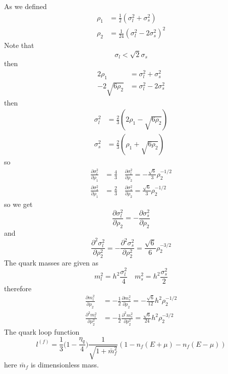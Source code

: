 \documentclass[12pt]{article}
\begin{document}
As we defined
\begin{equation}
\begin{split}
\rho_1&=\frac{1}{2}(\sigma_l^2+\sigma_s^2)\\
\rho_2&=\frac{1}{24}(\sigma_l^2-2 \sigma_s^2)^2
\end{split}
\end{equation}
Note that
\begin{equation}
\sigma_l < \sqrt{2} \sigma_s
\end{equation}
then
\begin{equation}
\begin{split}
2 \rho_1 & = \sigma_l^2 + \sigma_s^2 \\
-2 \sqrt{6 \rho_2} &=\sigma_l^2-2 \sigma_s^2
\end{split}
\end{equation}
then
\begin{equation}
\begin{split}
\sigma_l^2 &= \frac{2}{3}(2\rho_1-\sqrt{6 \rho_2})\\
\sigma_s^2 &= \frac{2}{3} ( \rho_1 + \sqrt{6 \rho_2})
\end{split}
\end{equation}
so
\begin{equation}
\begin{split}
\frac{\partial\sigma_l^2}{\partial \rho_1} &= \frac{4}{3} \quad
\frac{\partial\sigma_l^2}{\partial \rho_2} = -\frac{\sqrt{6}}{3} \rho_2^{-1/2} \\
\frac{\partial\sigma_s^2}{\partial \rho_1} &= \frac{2}{3} \quad
\frac{\partial\sigma_s^2}{\partial \rho_2} = \frac{\sqrt{6}}{3} \rho_2^{-1/2}
\end{split}
\end{equation}
so we get
\begin{equation}
\frac{\partial\sigma_l^2}{\partial \rho_2}=
-\frac{\partial\sigma_s^2}{\partial \rho_2}
\end{equation}
and
\begin{equation}
\frac{\partial^2 \sigma_l^2}{\partial \rho_2^2}=
- \frac{\partial^2 \sigma_s^2}{\partial \rho_2^2}=
\frac{\sqrt{6}}{6}\rho_2^{-3/2}
\end{equation}
The quark masses are given as
\begin{equation}
m_l^2=h^2 \frac{\sigma_l^2}{4} \quad m_s^2 =h^2 \frac {\sigma_s^2}{2}
\end{equation}
therefore
\begin{equation}
\begin{split}
\frac{\partial m_l^2}{\partial \rho_2} &
= -\frac{1}{2} \frac{\partial m_s^2}{\partial \rho_2}
= -\frac{\sqrt{6}}{12}h^2\rho_2^{-1/2}\\
\frac{\partial^2 m_l^2}{\partial \rho_2^2} &
=-\frac{1}{2}\frac{\partial^2 m_s^2}{\partial \rho_2^2}
=\frac{\sqrt{6}}{24}h^2 \rho_2^{-3/2}
\end{split}
\end{equation}
The quark loop function
\begin{equation}
l^{(f)}=\frac{1}{3}\Big(1-\frac{\eta_q}{4}\Big)\frac{1}{\sqrt{1+\bar m _f^2}}(1-n_f(E+\mu)-n_f(E-\mu))
\end{equation}
here $\bar m_f$ is dimensionless mass.
\end{document}
